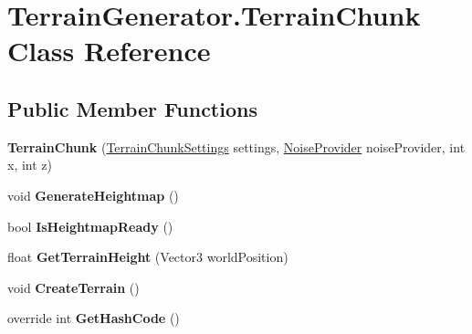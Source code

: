 \hypertarget{class_terrain_generator_1_1_terrain_chunk}{}\section{Terrain\+Generator.\+Terrain\+Chunk Class Reference}
\label{class_terrain_generator_1_1_terrain_chunk}
\subsection*{Public Member Functions}
\begin{DoxyCompactItemize}
\item 
\mbox{\label{class_terrain_generator_1_1_terrain_chunk_a5f9a207e4edf6a038f6ce5d29774c7ed}} 
{\bfseries Terrain\+Chunk} (\hyperlink{class_terrain_generator_1_1_terrain_chunk_settings}{Terrain\+Chunk\+Settings} settings, \hyperlink{class_terrain_generator_1_1_noise_provider}{Noise\+Provider} noise\+Provider, int x, int z)
\item 
\mbox{\label{class_terrain_generator_1_1_terrain_chunk_a879dc0fa37596ec9562eb6465af8267e}} 
void {\bfseries Generate\+Heightmap} ()
\item 
\mbox{\label{class_terrain_generator_1_1_terrain_chunk_a5edfb4ba74e40fa73881a74137d5ed37}} 
bool {\bfseries Is\+Heightmap\+Ready} ()
\item 
\mbox{\label{class_terrain_generator_1_1_terrain_chunk_aac1c2c9ee1206792cac075bd00359299}} 
float {\bfseries Get\+Terrain\+Height} (Vector3 world\+Position)
\item 
\mbox{\label{class_terrain_generator_1_1_terrain_chunk_add916a6f4ea99d10eb8694e5c0c26e9c}} 
void {\bfseries Create\+Terrain} ()
\item 
\mbox{\label{class_terrain_generator_1_1_terrain_chunk_a37654686785af5ae9a2b12b73687e75c}} 
override int {\bfseries Get\+Hash\+Code} ()
\item 
\mbox{\label{class_terrain_generator_1_1_terrain_chunk_a6d61ee1f748a37a3858ebea2fbd98e47}} 

\end{DoxyCompactItemize}
